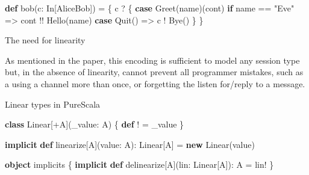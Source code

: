\documentclass[ignorenonframetext,]{beamer}
\newenvironment{Shaded}{}{}
\newcommand{\FunctionTok}[1]{\textcolor[rgb]{0.02,0.16,0.49}{#1}}
\newcommand{\KeywordTok}[1]{\textcolor[rgb]{0.00,0.44,0.13}{\textbf{#1}}}
\newcommand{\NormalTok}[1]{#1}
\newcommand{\StringTok}[1]{\textcolor[rgb]{0.25,0.44,0.63}{#1}}
\begin{document}
\begin{frame}[fragile]

\begin{Shaded}
\begin{Highlighting}[]
\KeywordTok{def} \FunctionTok{bob}\NormalTok{(c: In[AliceBob]) = \{}
\NormalTok{  c ? \{}
    \KeywordTok{case} \FunctionTok{Greet}\NormalTok{(name)(cont) }\KeywordTok{if}\NormalTok{ name == }\StringTok{"Eve"}\NormalTok{ =>}
\NormalTok{      cont !! }\FunctionTok{Hello}\NormalTok{(name)}
    \KeywordTok{case} \FunctionTok{Quit}\NormalTok{() =>}
\NormalTok{      c ! }\FunctionTok{Bye}\NormalTok{()}
\NormalTok{  \}}
\NormalTok{\}}
\end{Highlighting}
\end{Shaded}

\end{frame}

\begin{frame}{%
\protect\hypertarget{the-need-for-linearity}{%
The need for linearity}}

As mentioned in the paper, this encoding is sufficient to model any
session type but, in the absence of linearity, cannot prevent all
programmer mistakes, such as a using a channel more than once, or
forgetting the listen for/reply to a message.

\end{frame}

\begin{frame}[fragile]{%
\protect\hypertarget{linear-types-in-purescala}{%
Linear types in PureScala}}

\begin{Shaded}
\begin{Highlighting}[]
\KeywordTok{class}\NormalTok{ Linear[+A](_value: A) \{}
  \KeywordTok{def}\NormalTok{ ! = _value}
\NormalTok{\}}

\KeywordTok{implicit} \KeywordTok{def}\NormalTok{ linearize[A](value: A): Linear[A] = }\KeywordTok{new} \FunctionTok{Linear}\NormalTok{(value)}

\KeywordTok{object}\NormalTok{ implicits \{}
  \KeywordTok{implicit} \KeywordTok{def}\NormalTok{ delinearize[A](lin: Linear[A]): A = lin!}
\NormalTok{\}}
\end{Highlighting}
\end{Shaded}

\end{frame}
\end{document}
